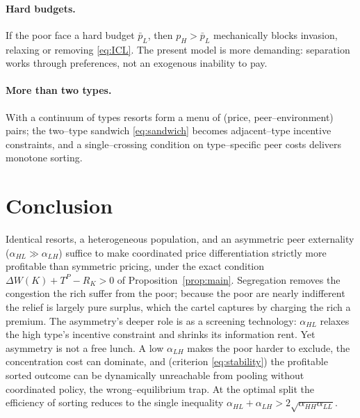 \documentclass[11pt]{article}
\theoremstyle{plain}
\theoremstyle{definition}
\theoremstyle{remark}
\newcommand{\aHH}{\alpha_{HH}}
\newcommand{\aHL}{\alpha_{HL}}
\newcommand{\aLH}{\alpha_{LH}}
\newcommand{\aLL}{\alpha_{LL}}
\newcommand{\TP}{T^{P}}
\begin{document}
\paragraph{Hard budgets.}
If the poor face a hard budget $\bar p_L$, then $p_H>\bar p_L$ mechanically blocks invasion,
relaxing or removing \eqref{eq:ICL}. The present model is more demanding: separation works
through preferences, not an exogenous inability to pay.

\paragraph{More than two types.}
With a continuum of types resorts form a menu of (price, peer--environment) pairs; the two--type
sandwich \eqref{eq:sandwich} becomes adjacent--type incentive constraints, and a single--crossing
condition on type--specific peer costs delivers monotone sorting.

\section{Conclusion}

Identical resorts, a heterogeneous population, and an asymmetric peer externality
($\aHL\gg\aLH$) suffice to make coordinated price differentiation strictly more profitable than
symmetric pricing, under the exact condition $\Delta W(K)+\TP-R_K>0$ of
Proposition~\ref{prop:main}. Segregation removes the congestion the rich suffer from the poor;
because the poor are nearly indifferent the relief is largely pure surplus, which the cartel
captures by charging the rich a premium. The asymmetry's deeper role is as a screening
technology: $\aHL$ relaxes the high type's incentive constraint and shrinks its information
rent. Yet asymmetry is not a free lunch. A low $\aLH$ makes the poor harder to exclude, the
concentration cost can dominate, and (criterion \eqref{eq:stability}) the profitable sorted
outcome can be dynamically unreachable from pooling without coordinated policy, the
wrong--equilibrium trap. At the optimal split the efficiency of sorting reduces to the single
inequality $\aHL+\aLH>2\sqrt{\aHH\aLL}$.

\appendix
\end{document}

